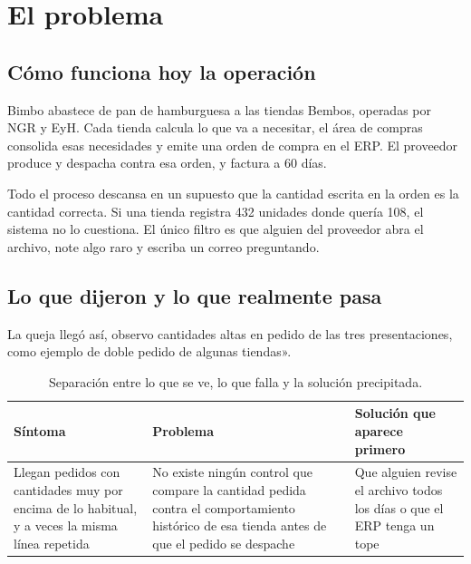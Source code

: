 
\section{El problema}

\subsection{Cómo funciona hoy la operación}

Bimbo abastece de pan de hamburguesa a las tiendas Bembos, operadas por NGR y EyH. Cada tienda calcula lo que va a necesitar, el área de compras consolida esas necesidades y emite una orden de compra en el ERP. El proveedor produce y despacha contra esa orden, y factura a 60 días.

Todo el proceso descansa en un supuesto que  la cantidad escrita en la orden es la cantidad correcta. Si una tienda registra 432 unidades donde quería 108, el sistema no lo cuestiona. El único filtro es que alguien del proveedor abra el archivo, note algo raro y escriba un correo preguntando.

\subsection{Lo que dijeron y lo que realmente pasa}

La queja llegó así, observo cantidades altas en pedido de las tres presentaciones, como ejemplo de doble pedido de algunas tiendas». 

\begin{table}[htbp]
\centering
\caption{Separación entre lo que se ve, lo que falla y la solución precipitada.}
\label{tab:sintoma}
\small
\begin{tabularx}{\textwidth}{@{}YYY@{}}
\toprule
\textbf{Síntoma} & \textbf{Problema} & \textbf{Solución que aparece primero} \\
\midrule
Llegan pedidos con cantidades muy por encima de lo habitual, y a veces la misma línea repetida &
No existe ningún control que compare la cantidad pedida contra el comportamiento histórico de esa tienda antes de que el pedido se despache &
Que alguien revise el archivo todos los días o que el ERP tenga un tope \\
\bottomrule
\end{tabularx}
\end{table}

